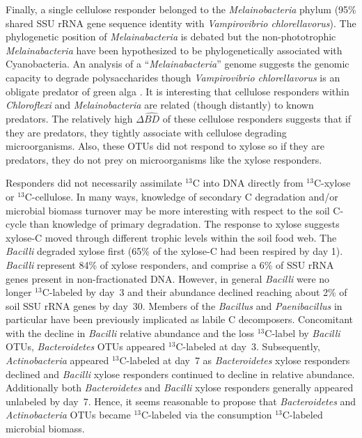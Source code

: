 Finally, a single cellulose responder belonged to the \textit{Melainobacteria}
phylum (95\% shared SSU rRNA gene sequence identity with \textit{Vampirovibrio
chlorellavorus}). The phylogenetic position of \textit{Melainabacteria} is
debated but the non-phototrophic \textit{Melainabacteria} have been
hypothesized to be phylogenetically associated with Cyanobacteria. An analysis
of a ``\textit{Melainabacteria}'' genome \citep{Di_Rienzi_2013} suggests the
genomic capacity to degrade polysaccharides though \textit{Vampirovibrio
chlorellavorus} is an obligate predator of green alga \citep{gromov_1972}. It
is interesting that cellulose responders within \textit{Chloroflexi} and
\textit{Melainobacteria} are related (though distantly) to known predators. The
relatively high $\Delta\hat{BD}$ of these cellulose responders suggests that if
they are predators, they tightly associate with cellulose degrading
microorganisms. Also, these OTUs did not respond to xylose so if they are
predators, they do not prey on microorganisms like the xylose responders.

Responders did not necessarily assimilate $^{13}$C into DNA directly
from $^{13}$C-xylose or $^{13}$C-cellulose. In many ways, knowledge of
secondary C degradation and/or microbial biomass turnover may be more
interesting with respect to the soil C-cycle than knowledge of primary
degradation. The response to xylose suggests xylose-C moved through different
trophic levels within the soil food web. The \textit{Bacilli} degraded xylose
first (65\% of the xylose-C had been respired by day 1). \textit{Bacilli}
represent 84\% of xylose responders, and comprise a 6\% of SSU rRNA genes
present in non-fractionated DNA. However, in general \textit{Bacilli} were no
longer $^{13}$C-labeled by day~3 and their abundance declined reaching about
2\% of soil SSU rRNA genes by day~30. Members of the \textit{Bacillus}
\citep{Cleveland2007} and \textit{Paenibacillus} in particular
\citep{Verastegui_2014} have been previously implicated as labile
C decomposers. Concomitant with the decline in \textit{Bacilli} relative
abundance and the loss $^{13}$C-label by \textit{Bacilli} OTUs,
\textit{Bacteroidetes} OTUs appeared $^{13}$C-labeled at day~3. Subsequently,
\textit{Actinobacteria} appeared $^{13}$C-labeled at day~7 as
\textit{Bacteroidetes} xylose responders declined and \textit{Bacilli} xylose
responders continued to decline in relative abundance. Additionally both
\textit{Bacteroidetes} and \textit{Bacilli} xylose responders generally
appeared unlabeled by day~7. Hence, it seems reasonable to propose that
\textit{Bacteroidetes} and \textit{Actinobacteria} OTUs became $^{13}$C-labeled
via the consumption $^{13}$C-labeled microbial biomass. 

